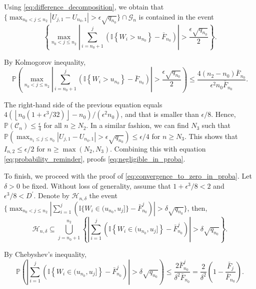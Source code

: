 \documentclass[sn-mathphys-ay]{sn-jnl}%
\renewcommand{\P}{\mathbb{P}}
\begin{document}
\begin{appendices}
Using \eqref{eq:difference_decomposition}, we obtain that $\{ \max_{n_0 < j \leq n_2}
    \left| U_{j,1}-U_{n_0,1} \right|>\epsilon\sqrt{q_{n_0}} \}\cap\mathcal{G}_n$ is
contained in the event
\begin{equation*}
    \left\{\underset{n_0< j \leq n_2}\max \left|\sum\limits_{i = n_0+1}^j \left(\mathbb{I}\left\{ {{W_i} > u_{n_0}} \right\}-\bar{F}_{n_0}\right)\right|>\frac{\epsilon\sqrt{q_{n_0}}}{2}\right\}.
\end{equation*}

By Kolmogorov inequality,
\begin{equation*}
    \P\left(\underset{n_0< j \leq n_2}\max \left|\sum\limits_{i = n_0+1}^j \left(\mathbb{I}\left\{ {{W_i} > u_{n_0}} \right\}-\bar{F}_{n_0}\right)\right|>\frac{\epsilon\sqrt{q_{n_0}}}{2}\right) \leq \frac{4\left(n_2-n_0\right)\bar{F}_{n_0}}{\epsilon^2 n_0\bar{F}_{n_0}}.
\end{equation*}

The right-hand side of the previous equation equals ${4\left(\left\lfloor
            n_0\left(1+{\epsilon^3}/{32}\right) \right\rfloor-n_0\right)}/{(\epsilon^2 n_0)}$,
and that is smaller than $\epsilon/8$. Hence, $\P\left(\mathcal{C}_n\right) \leq
    \frac{\epsilon}{4}$ for all $n\geq N_2$. In a similar fashion, we can find $N_3$ such
that $\P\left(\max_{{n_1\leq j \leq n_0}} \left| U_{j,1}-U_{n_0,1}
    \right|>\epsilon\sqrt{q_{n_0}}\right)\leq {\epsilon}/{4}$ for $n\geq N_3$. This shows
that $I_{n,2}\leq{\epsilon}/{2}$ for $n\geq\max(N_2,N_3)$. Combining this with
equation \eqref{eq:probability_reminder}, proofs \eqref{eq:negligible_in_proba}.

To finish, we proceed with the proof of \eqref{eq:convergence_to_zero_in_proba}. Let
$\delta>0$ be fixed. Without loss of generality, assume that $1+{\epsilon^3}/{8}<2$
and ${\epsilon^3}/{8}<D^{\prime}$. Denote by $\mathcal{H}_{n,\delta}$ the event
$\{{\max_{n_0< j \leq n_2}}|\sum_{i = 1}^{j} (\mathbb{I}\{ {{W_i} \in (u_{n_0},u_j]}
    \}-\bar{F}_{n_0}^{j})|>\delta \sqrt{q_{n_0}} \}$, then,
\begin{equation}\label{eq:maximum_inclusion}
    \mathcal{H}_{n,\delta}\subseteq\bigcup_{j=n_0+1}^{n_2}{\left\{ \left|\sum\limits_{i = 1}^{j} \left(\mathbb{I}\left\{ {{W_i} \in (u_{n_0},u_j]} \right\}-\bar{F}_{n_0}^{j}\right)\right|>\delta\sqrt{q_{n_0}} \right\}}.
\end{equation}

By Chebyshev's inequality,
\begin{equation*}
    \P\left( \left|\sum\limits_{i = 1}^{j} \left(\mathbb{I}\left\{ {{W_i} \in (u_{n_0},u_j]} \right\}-\bar{F}_{n_0}^{j}\right)\right|>\delta\sqrt{q_{n_0}} \right)\leq \frac{2\bar{F}_{n_0}^{j}}{\delta^2 \bar{F}_{n_0}}=\frac{2}{\delta^2}\left(1-\frac{\bar{F}_j}{\bar{F}_{n_0}}\right).
\end{equation*}


\end{appendices}
\end{document}
